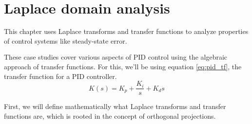 \section{Laplace domain analysis}
\label{sec:laplace-domain-analysis}

This chapter uses Laplace transforms and transfer functions to analyze
properties of control systems like \gls{steady-state error}.

These case studies cover various aspects of PID control using the algebraic
approach of transfer functions. For this, we'll be using equation
\eqref{eq:pid_tf}, the transfer function for a PID controller.
\begin{equation}
  K(s) = K_p + \frac{K_i}{s} + K_ds \label{eq:pid_tf}
\end{equation}

First, we will define mathematically what Laplace transforms and transfer
functions are, which is rooted in the concept of orthogonal projections.

\renewcommand*{\sectionpath}{\chapterpath/laplace-domain-analysis}







